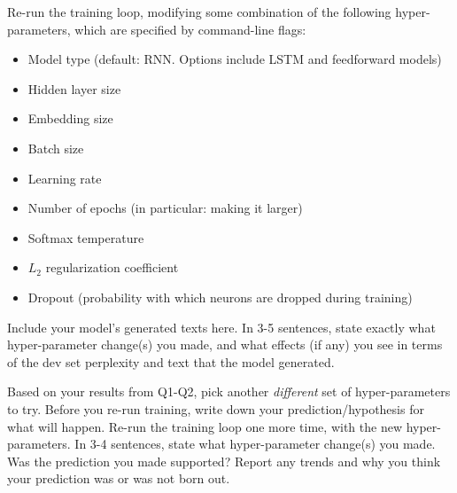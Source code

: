 \documentclass[11pt]{article}
\begin{document}
\vspace{2em}
 Re-run the training loop, modifying some combination of the following hyper-parameters, which are specified by command-line flags:
\begin{itemize}
  \item Model type (default: RNN. Options include LSTM and feedforward models)
  \item Hidden layer size
  \item Embedding size
  \item Batch size
  \item Learning rate
  \item Number of epochs (in particular: making it larger)
  \item Softmax temperature
  \item $L_2$ regularization coefficient
  \item Dropout (probability with which neurons are dropped during training)
\end{itemize}
Include your model's generated texts here. In 3-5 sentences, state exactly what hyper-parameter change(s) you made, and what effects (if any) you see in terms of the dev set perplexity and text that the model generated.

\vspace{2em}
 Based on your results from Q1-Q2, pick another \textit{different} set of hyper-parameters to try. Before you re-run training, write down your prediction/hypothesis for what will happen. Re-run the training loop one more time, with the new hyper-parameters. In 3-4 sentences, state what hyper-parameter change(s) you made. Was the prediction you made supported? Report any trends and why you think your prediction was or was not born out.
\end{document}
